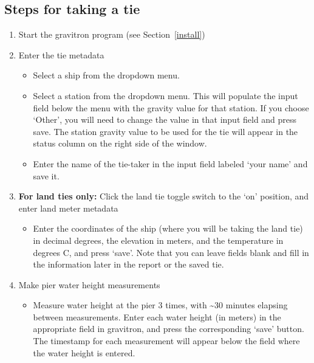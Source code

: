 \documentclass{pfpe-manual}
\begin{document}
\subsection{Steps for taking a tie}
\label{tie-instructions}
\begin{enumerate}
\item Start the gravitron program (see Section~\ref{install})
\item Enter the tie metadata
    \begin{itemize}
    \item Select a ship from the dropdown menu.
    \item Select a station from the dropdown menu. This will populate the input field below the menu with the gravity value for that station. If you choose `Other', you will need to change the value in that input field and press save. The station gravity value to be used for the tie will appear in the status column on the right side of the window.
    \item Enter the name of the tie-taker in the input field labeled `your name' and save it.
    \end{itemize}
\item \textbf{For land ties only:} Click the land tie toggle switch to the `on' position, and enter land meter metadata
    \begin{itemize}
    \item Enter the coordinates of the ship (where you will be taking the land tie) in decimal degrees, the elevation in meters, and the temperature in degrees C, and press `save'. Note that you can leave fields blank and fill in the information later in the report or the saved tie.
    \end{itemize}
\item Make pier water height measurements
    \begin{itemize}
    \item Measure water height at the pier 3 times, with \textasciitilde 30 minutes elapsing between measurements. Enter each water height (in meters) in the appropriate field in gravitron, and press the corresponding `save' button. The timestamp for each measurement will appear below the field where the water height is entered.

\end{itemize}
\end{enumerate}
\end{document}
